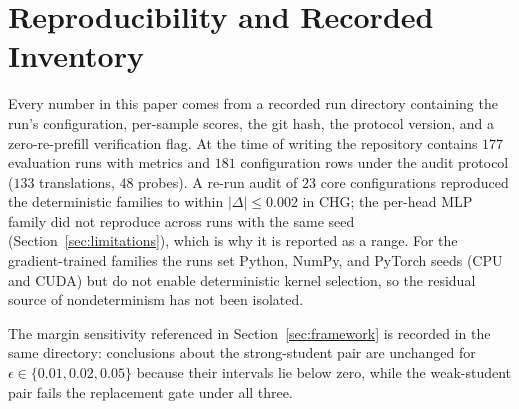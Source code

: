 \documentclass{article} %
\begin{document}
\begin{table}[h]
\centering
\caption{Our implementation of the closest strict-zero-re-prefill design
\citep{heo2026} and where it differs from the reference. Both configurations of
our implementation fail (Table~\ref{tab:main}).}
\label{tab:impl}
\end{table}

\section{Reproducibility and Recorded Inventory}
\label{app:repro}

Every number in this paper comes from a recorded run directory containing the
run's configuration, per-sample scores, the git hash, the protocol version, and
a zero-re-prefill verification flag. At the time of writing the repository
contains $177$ evaluation runs with metrics and $181$ configuration rows under
the audit protocol ($133$ translations, $48$ probes). A re-run audit of $23$
core configurations reproduced the deterministic families to within $|\Delta|
\le 0.002$ in CHG; the per-head MLP family did not reproduce across runs with
the same seed (Section~\ref{sec:limitations}), which is why it is reported as a
range. For the gradient-trained families the runs set Python, NumPy, and PyTorch
seeds (CPU and CUDA) but do not enable deterministic kernel selection, so the
residual source of nondeterminism has not been isolated.

The margin sensitivity referenced in Section~\ref{sec:framework} is recorded in
the same directory: conclusions about the strong-student pair are unchanged for
$\epsilon\in\{0.01,0.02,0.05\}$ because their intervals lie below zero, while
the weak-student pair fails the replacement gate under all three.
\end{document}
